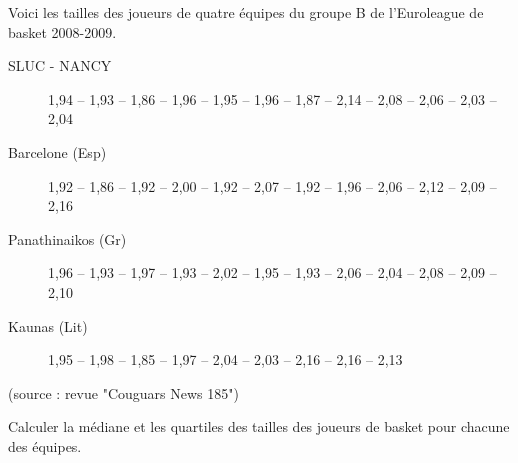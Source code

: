 
Voici les tailles des joueurs de quatre équipes du groupe B de l’Euroleague de basket 2008-2009.
\begin{description}
\item[SLUC - NANCY] 1,94 – 1,93 – 1,86 – 1,96 – 1,95 – 1,96 –
1,87 – 2,14 – 2,08 – 2,06 – 2,03 – 2,04
\item[Barcelone (Esp)]  1,92 – 1,86 – 1,92 – 2,00 – 1,92 – 2,07 –
1,92 – 1,96 – 2,06 – 2,12 – 2,09 – 2,16
\item[Panathinaikos (Gr)] 1,96 – 1,93 – 1,97 – 1,93 – 2,02 – 1,95
– 1,93 – 2,06 – 2,04 – 2,08 – 2,09 – 2,10
\item[Kaunas (Lit)]  1,95 – 1,98 – 1,85 – 1,97 – 2,04 – 2,03 – 2,16
– 2,16 – 2,13
\end{description}
(source : revue "Couguars News 185")


Calculer la médiane et les quartiles des tailles des joueurs de basket pour chacune des équipes.

